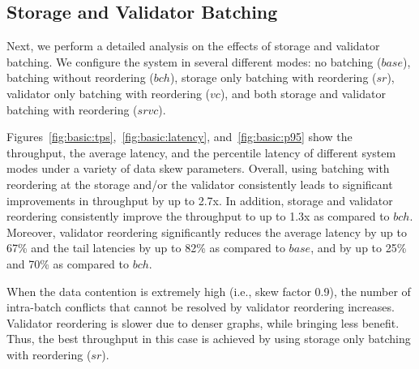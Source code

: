 \subsection{Storage and Validator Batching}
\label{subsec:experiment:batching}

Next, we perform a detailed analysis on the effects of storage and validator batching. We configure the system in several different modes: no batching ($base$), batching without reordering ($bch$), storage only batching with reordering ($sr$), validator only batching with reordering
($vc$), and both storage and validator batching with reordering ($srvc$).




Figures~\ref{fig:basic:tps},~\ref{fig:basic:latency}, and~\ref{fig:basic:p95} show the throughput, the average latency, and the percentile latency of different system modes under a variety of data skew parameters. Overall, using batching with reordering at the storage and/or the validator consistently leads to significant improvements in throughput by up to 2.7x. In addition, storage and validator reordering consistently improve the throughput to up to 1.3x as compared to $bch$. Moreover, validator reordering significantly reduces the average latency by up to 67\% and the tail latencies by up to 82\% as compared to $base$, and by up to 25\% and 70\% as compared to $bch$.

When the data contention is extremely high (i.e., skew factor 0.9), the number of intra-batch conflicts
that cannot be resolved by validator reordering increases. Validator reordering
is slower due to denser graphs, while bringing less benefit. Thus, the best throughput in this case is achieved by using storage only batching with reordering ($sr$). 

